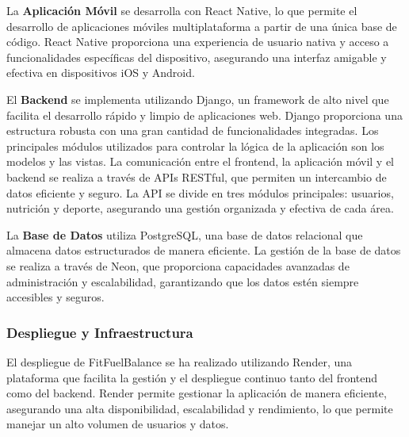     La \textbf{Aplicación Móvil} se desarrolla con React Native, lo que permite el desarrollo de aplicaciones móviles multiplataforma a partir de una única base de código. React Native proporciona una experiencia de usuario nativa y acceso a funcionalidades específicas del dispositivo, asegurando una interfaz amigable y efectiva en dispositivos iOS y Android.
    
    El \textbf{Backend} se implementa utilizando Django, un framework de alto nivel que facilita el desarrollo rápido y limpio de aplicaciones web. Django proporciona una estructura robusta con una gran cantidad de funcionalidades integradas. Los principales módulos utilizados para controlar la lógica de la aplicación son los modelos y las vistas. La comunicación entre el frontend, la aplicación móvil y el backend se realiza a través de APIs RESTful, que permiten un intercambio de datos eficiente y seguro. La API se divide en tres módulos principales: usuarios, nutrición y deporte, asegurando una gestión organizada y efectiva de cada área.
    
    La \textbf{Base de Datos} utiliza PostgreSQL, una base de datos relacional que almacena datos estructurados de manera eficiente. La gestión de la base de datos se realiza a través de Neon, que proporciona capacidades avanzadas de administración y escalabilidad, garantizando que los datos estén siempre accesibles y seguros.
    

\subsubsection{Despliegue y Infraestructura}

El despliegue de FitFuelBalance se ha realizado utilizando Render, una plataforma que facilita la gestión y el despliegue continuo tanto del frontend como del backend. Render permite gestionar la aplicación de manera eficiente, asegurando una alta disponibilidad, escalabilidad y rendimiento, lo que permite manejar un alto volumen de usuarios y datos.
